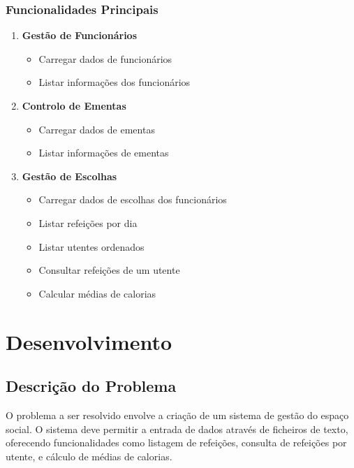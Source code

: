 \documentclass[a4paper,12pt]{report}
\begin{document}
\subsection{Funcionalidades Principais}
\begin{enumerate}
    \item \textbf{Gestão de Funcionários}
    \begin{itemize}
        \item Carregar dados de funcionários
        \item Listar informações dos funcionários
    \end{itemize}

    \item \textbf{Controlo de Ementas}
    \begin{itemize}
        \item Carregar dados de ementas
        \item Listar informações de ementas
    \end{itemize}

    \item \textbf{Gestão de Escolhas}
    \begin{itemize}
        \item Carregar dados de escolhas dos funcionários
        \item Listar refeições por dia
        \item Listar utentes ordenados
        \item Consultar refeições de um utente
        \item Calcular médias de calorias
    \end{itemize}
\end{enumerate}

\chapter{Desenvolvimento}

\section{Descrição do Problema}
O problema a ser resolvido envolve a criação de um sistema de gestão do espaço social. O sistema deve permitir a entrada de dados através de ficheiros de texto, oferecendo funcionalidades como listagem de refeições, consulta de refeições por utente, e cálculo de médias de calorias.
\end{document}
